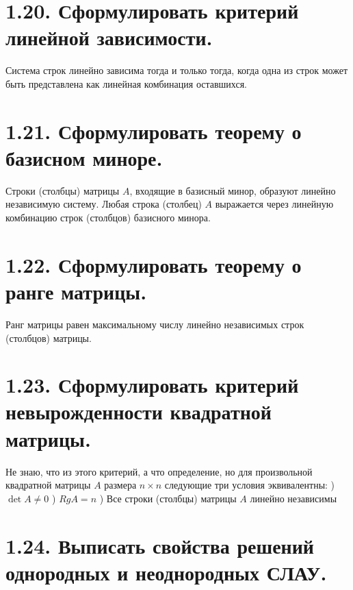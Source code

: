 \documentclass{article}
\begin{document}
\section*{\LARGE 1.20. Сформулировать критерий линейной зависимости.  }

Система строк линейно зависима тогда и только тогда, когда одна из строк может быть представлена как линейная комбинация оставшихся.

\section*{\LARGE 1.21. Сформулировать теорему о базисном миноре.  }

Строки (столбцы) матрицы $A$, входящие в базисный минор, образуют линейно независимую систему. Любая строка (столбец) $A$ выражается через линейную комбинацию строк (столбцов) базисного минора.

\section*{\LARGE 1.22. Сформулировать теорему о ранге матрицы.  }

Ранг матрицы равен максимальному числу линейно независимых строк (столбцов) матрицы.

\section*{\LARGE 1.23. Сформулировать критерий невырожденности квадратной матрицы. }

Не знаю, что из этого критерий, а что определение, но для произвольной квадратной матрицы $A$ размера $n \times n$ следующие три условия эквивалентны:
) $\det{A} \ne 0$
) $RgA = n$
) Все строки (столбцы) матрицы $A$ линейно независимы

\section*{\LARGE 1.24. Выписать свойства решений однородных и неоднородных СЛАУ.  }
\end{document}
